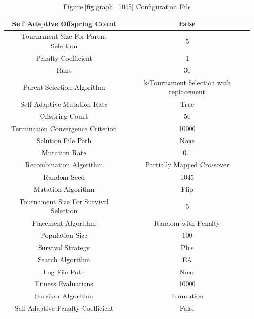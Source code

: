 \documentclass{standalone}
\begin{document}
\begin{table}[!htb]
	\centering
	\caption{Figure \ref{fig:graph_1045} Configuration File}
	\label{tab:graph_1045}
	\begin{tabular}{| c | c |}
		\hline
		Self Adaptive Offspring Count		& False		 \\
		\hline
		Tournament Size For Parent Selection		& 5		 \\
		\hline
		Penalty Coefficient		& 1		 \\
		\hline
		Runs		& 30		 \\
		\hline
		Parent Selection Algorithm		& k-Tournament Selection with replacement		 \\
		\hline
		Self Adaptive Mutation Rate		& True		 \\
		\hline
		Offspring Count		& 50		 \\
		\hline
		Termination Convergence Criterion		& 10000		 \\
		\hline
		Solution File Path		& None		 \\
		\hline
		Mutation Rate		& 0.1		 \\
		\hline
		Recombination Algorithm		& Partially Mapped Crossover		 \\
		\hline
		Random Seed		& 1045		 \\
		\hline
		Mutation Algorithm		& Flip		 \\
		\hline
		Tournament Size For Survival Selection		& 5		 \\
		\hline
		Placement Algorithm		& Random with Penalty		 \\
		\hline
		Population Size		& 100		 \\
		\hline
		Survival Strategy		& Plus		 \\
		\hline
		Search Algorithm		& EA		 \\
		\hline
		Log File Path		& None		 \\
		\hline
		Fitness Evaluations		& 10000		 \\
		\hline
		Survivor Algorithm		& Truncation		 \\
		\hline
		Self Adaptive Penalty Coefficient		& False		 \\
		\hline
	\end{tabular}
\end{table}
\end{document}
